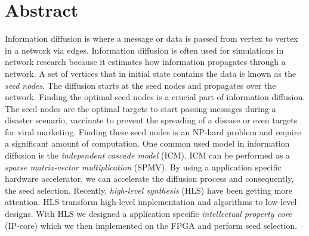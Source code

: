 \section*{Abstract}

Information diffusion is where a message or data is passed from vertex to vertex in a network via edges. Information diffusion is often used for simulations in network research because it estimates how information propagates through a network. A set of vertices that in initial state contains the data is known as the \textit{seed nodes}. The diffusion starts at the seed nodes and propagates over the network. Finding the optimal seed nodes is a crucial part of information diffusion. The seed nodes are the optimal targets to start passing messages during a disaster scenario, vaccinate to prevent the spreading of a disease or even targets for viral marketing. Finding these seed nodes is an NP-hard problem and require a significant amount of computation. One common used model in information diffusion is the \textit{independent cascade model} (ICM). ICM can be performed as a \textit{sparse matrix-vector multiplication} (SPMV). By using a application specific hardware accelerator, we can accelerate the diffusion process and consequently, the seed selection. Recently, \textit{high-level synthesis} (HLS) have been getting more attention. HLS transform high-level implementation and algorithms to low-level designs. With HLS we designed a application specific \textit{intellectual property core} (IP-core)
which we then implemented on the FPGA and perform seed selection. 
